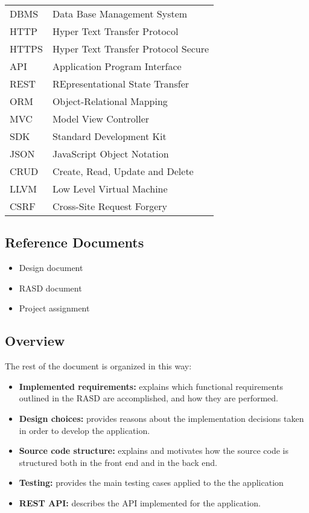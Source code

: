 \begin{center}
	\begin{tabular}{| l | l |}
		\hline
		DBMS & Data Base Management System\\
		HTTP & Hyper Text Transfer Protocol\\
		HTTPS & Hyper Text Transfer Protocol Secure\\
		API & Application Program Interface \\
		REST & REpresentational State Transfer\\
		ORM & Object-Relational Mapping\\
		MVC & Model View Controller\\
		SDK & Standard Development Kit\\
		JSON & JavaScript Object Notation \\
		CRUD & Create, Read, Update and Delete\\
		LLVM & Low Level Virtual Machine\\
		CSRF & Cross-Site Request Forgery\\
		\hline
	\end{tabular}
\end{center}

\subsection{Reference Documents}
\begin{itemize}
	\item Design document
	\item RASD document
	\item Project assignment
\end{itemize}

\subsection{Overview}
The rest of the document is organized in this way:
\begin{itemize}
	
	\item \textbf{Implemented requirements:} explains which functional requirements outlined in the RASD are accomplished, and how they are performed.
	\item \textbf{Design choices:} provides reasons about the implementation decisions taken in order to develop the application.
	\item \textbf{Source code structure:} explains and motivates how the source code is structured both in the front end and in the back end.
	\item \textbf{Testing:} provides the main testing cases applied to the the application
	\item \textbf{REST API:} describes the API implemented for the application.
	
\end{itemize}

